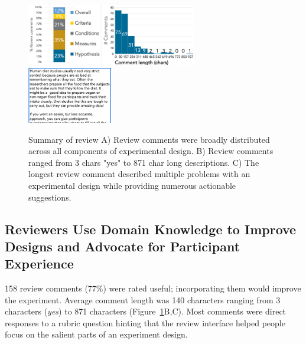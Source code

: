 
\begin{figure}[h] 
  \centering
  \includegraphics[width=0.66\textwidth]{figures/galileo/galileo-study2-2}
  \includegraphics[width=0.33\textwidth]{figures/galileo/galileo-study2-3}
  \caption[Result: Review comments were distributed across all components of experimental design]
{Summary of review A) Review comments were broadly distributed across all components of experimental design. B) Review comments ranged from 3 chars "yes" to 871 char long descriptions. C) The longest review comment described multiple problems with an experimental design while providing numerous actionable suggestions. }
  \label{fig:galileo-9-result}
\end{figure}

\subsection{Reviewers Use Domain Knowledge to Improve Designs and Advocate for Participant Experience}
158 review comments (77\%) were rated useful; incorporating them would improve the experiment. Average comment length was 140 characters ranging from 3 characters (\textit{yes}) to 871 characters (Figure~\ref{fig:galileo-9-result}B,C). Most comments were direct responses to a rubric question hinting that the review interface helped people focus on the salient parts of an experiment design.

